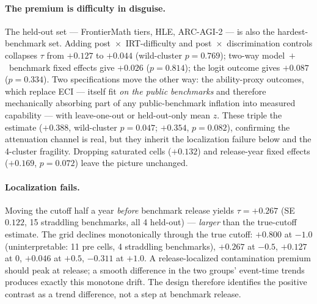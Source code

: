 \documentclass[11pt]{article}
\begin{document}
\paragraph{The premium is difficulty in disguise.} The held-out set ---
FrontierMath tiers, HLE, ARC-AGI-2 --- is also the hardest-benchmark set.
Adding post~$\times$~IRT-difficulty and post~$\times$~discrimination
controls collapses $\tau$ from $+0.127$ to $+0.044$ (wild-cluster $p=0.769$);
two-way model~$+$~benchmark fixed effects give $+0.026$ ($p=0.814$); the
logit outcome gives $+0.087$ ($p=0.334$). Two specifications move the other
way: the ability-proxy outcomes, which replace ECI --- itself fit
\emph{on the public benchmarks} \cite{ho2025} and therefore mechanically
absorbing part of any public-benchmark inflation into measured capability
--- with leave-one-out or held-out-only mean $z$. These triple the estimate
($+0.388$, wild-cluster $p=0.047$; $+0.354$, $p=0.082$), confirming the
attenuation channel is real, but they inherit the localization failure
below and the 4-cluster fragility. Dropping saturated cells ($+0.132$) and
release-year fixed effects ($+0.169$, $p=0.072$) leave the picture
unchanged.

\paragraph{Localization fails.} Moving the cutoff half a year \emph{before}
benchmark release yields $\tau=+0.267$ (SE $0.122$, 15 straddling
benchmarks, all 4 held-out) --- \emph{larger} than the true-cutoff
estimate. The grid declines monotonically through the true cutoff:
$+0.800$ at $-1.0$ (uninterpretable: 11 pre cells, 4 straddling
benchmarks), $+0.267$ at $-0.5$, $+0.127$ at $0$, $+0.046$ at $+0.5$,
$-0.311$ at $+1.0$. A release-localized contamination premium should peak
at release; a smooth difference in the two groups' event-time trends
produces exactly this monotone drift. The design therefore identifies the
positive contrast as a trend difference, not a step at benchmark release.
\end{document}
